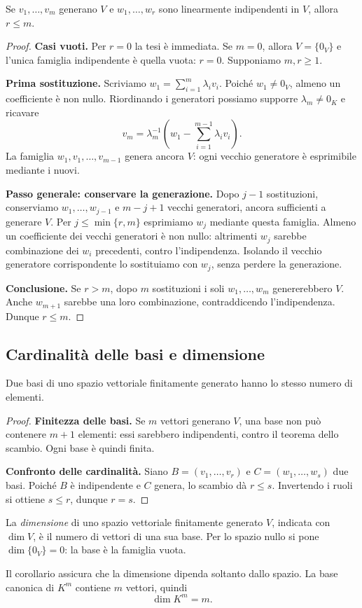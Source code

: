 \begin{teorema}
Se $v_1,\ldots,v_m$ generano $V$ e $w_1,\ldots,w_r$ sono linearmente indipendenti in $V$, allora $r\leq m$.
\end{teorema}
\begin{proof}
\textbf{Casi vuoti.} Per $r=0$ la tesi è immediata. Se $m=0$, allora $V=\{0_V\}$ e l'unica famiglia indipendente è quella vuota: $r=0$. Supponiamo $m,r\ge1$.

\textbf{Prima sostituzione.} Scriviamo $w_1=\sum_{i=1}^m\lambda_iv_i$. Poiché $w_1\ne0_V$, almeno un coefficiente è non nullo. Riordinando i generatori possiamo supporre $\lambda_m\ne0_K$ e ricavare
\[
  v_m=\lambda_m^{-1}\left(w_1-\sum_{i=1}^{m-1}\lambda_i v_i\right).
\]
La famiglia $w_1,v_1,\ldots,v_{m-1}$ genera ancora $V$: ogni vecchio generatore è esprimibile mediante i nuovi.

\textbf{Passo generale: conservare la generazione.} Dopo $j-1$ sostituzioni, conserviamo $w_1,\ldots,w_{j-1}$ e $m-j+1$ vecchi generatori, ancora sufficienti a generare $V$. Per $j\le\min\{r,m\}$ esprimiamo $w_j$ mediante questa famiglia. Almeno un coefficiente dei vecchi generatori è non nullo: altrimenti $w_j$ sarebbe combinazione dei $w_i$ precedenti, contro l'indipendenza. Isolando il vecchio generatore corrispondente lo sostituiamo con $w_j$, senza perdere la generazione.

\textbf{Conclusione.} Se $r>m$, dopo $m$ sostituzioni i soli $w_1,\ldots,w_m$ genererebbero $V$. Anche $w_{m+1}$ sarebbe una loro combinazione, contraddicendo l'indipendenza. Dunque $r\le m$.
\end{proof}

\subsection{Cardinalità delle basi e dimensione}

\begin{corollario}
Due basi di uno spazio vettoriale finitamente generato hanno lo stesso numero di elementi.
\end{corollario}
\begin{proof}
\textbf{Finitezza delle basi.} Se $m$ vettori generano $V$, una base non può contenere $m+1$ elementi: essi sarebbero indipendenti, contro il teorema dello scambio. Ogni base è quindi finita.

\textbf{Confronto delle cardinalità.} Siano $B=(v_1,\ldots,v_r)$ e $C=(w_1,\ldots,w_s)$ due basi. Poiché $B$ è indipendente e $C$ genera, lo scambio dà $r\le s$. Invertendo i ruoli si ottiene $s\le r$, dunque $r=s$.
\end{proof}

\begin{definizione}
La \emph{dimensione} di uno spazio vettoriale finitamente generato $V$, indicata con $\dim V$, è il numero di vettori di una sua base. Per lo spazio nullo si pone $\dim\{0_V\}=0$: la base è la famiglia vuota.
\end{definizione}

Il corollario assicura che la dimensione dipenda soltanto dallo spazio. La base canonica di $K^m$ contiene $m$ vettori, quindi
\[
  \dim K^m=m.
\]
